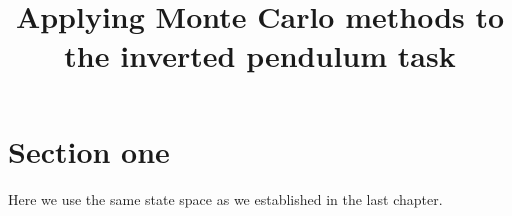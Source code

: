 \documentclass[12pt]{article}
\title{Applying Monte Carlo methods to the inverted pendulum task}
\date{}
\begin{document}
\maketitle

\section{Section one}
Here we use the same state space as we established in the last chapter.
\end{document}
